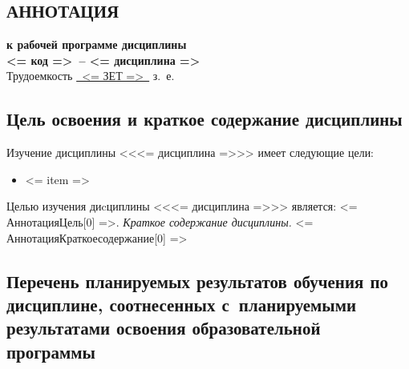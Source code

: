 \documentclass[a4paper,12pt]{article}
\begin{document}
\begin{center}
\section{АННОТАЦИЯ}
  {\bf к рабочей программе дисциплины\\
  <= код =>\ -- <= дисциплина =>} \\
  Трудоемкость \uline{~<= ЗЕТ =>~} з.~е.
\end{center}


\subsection{Цель освоения и краткое содержание дисциплины}
  Изучение дисциплины <<<= дисциплина =>>> имеет следующие цели:
  \begin{itemize}%
    \item <= item => %
  \end{itemize}
  Целью изучения диcциплины <<<= дисциплина =>>> является: <= АннотацияЦель[0] =>.
  \textit{Краткое содержание дисциплины.} <= АннотацияКраткоесодержание[0] =>
  



\subsection{Перечень планируемых результатов обучения по дисциплине, соотнесенных с~планируемыми результатами освоения образовательной программы}
\end{document}
